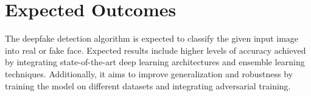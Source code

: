 \justifying
\chapter{Expected Outcomes}
	The deepfake detection algorithm is expected to classify the given input image into real or fake face. Expected results include higher levels of accuracy achieved by integrating state-of-the-art deep learning architectures and ensemble learning techniques.
	Additionally, it aims to improve generalization and robustness by training the model on different datasets and integrating adversarial training.

